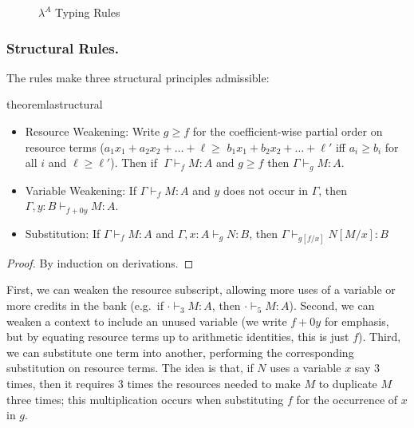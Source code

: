 \begin{figure}
  
  \vspace{-0.2in}
  \caption{$\lambda^A$ Typing Rules}
  \label{fig:la-ty-rules}
\end{figure}

\subsubsection{Structural Rules.}

The rules make three structural principles admissible:

\begin{restatable}{theorem}{lastructural} \label{thm:la-structural}\hfill
  \begin{itemize}
\item Resource Weakening: Write $g \ge f$ for the coefficient-wise
  partial order on resource terms ($a_1 x_1 + a_2 x_2 + \ldots + \ell
  \ge$ $b_1 x_1 + b_2 x_2 + \ldots + \ell'$ iff $a_i \ge b_i$ for all
  $i$ and $\ell \ge \ell'$).  Then if $\; \Gamma \vdash_f M : A$ and $g
  \geq f$ then $\Gamma \vdash_g M : A$.

\item Variable Weakening:
If $\Gamma \vdash_f M : A$ and $y$ does not occur in $\Gamma$, then $\Gamma,y:B \vdash_{f+0y} M : A$.
  
\item
    Substitution: 
If $\Gamma \vdash_f M : A$ and $\Gamma, x : A \vdash_g N : B$, then
$\Gamma \vdash_{g[f/x]} N[M/x] : B$

  \end{itemize}
\end{restatable}
\begin{proof}
By induction on derivations.
\end{proof}

First, we can weaken the resource subscript, allowing more uses of a
variable or more credits in the bank (e.g.\ if $\cdot \vdash_3 M : A$,
then $\cdot \vdash_5 M : A$).  Second, we can weaken a context
to include an unused variable (we write $f+0y$ for emphasis, but by
equating resource terms up to arithmetic identities, this is just $f$).
Third, we can substitute one term into another, performing the
corresponding substitution on resource terms.  The idea is that, if $N$
uses a variable $x$ say $3$ times, then it requires 3 times the
resources needed to make $M$ to duplicate $M$ three times; this
multiplication occurs when substituting $f$ for the occurrence of $x$ in
$g$.

